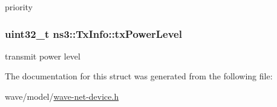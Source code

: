 priority 

\subsubsection[{\texorpdfstring{tx\+Power\+Level}{txPowerLevel}}]{\setlength{\rightskip}{0pt plus 5cm}uint32\+\_\+t ns3\+::\+Tx\+Info\+::tx\+Power\+Level}\hypertarget{structns3_1_1TxInfo_a41e42165fb6589d7348de2d7c97a2c57}{}\label{structns3_1_1TxInfo_a41e42165fb6589d7348de2d7c97a2c57}


transmit power level 



The documentation for this struct was generated from the following file\+:\begin{DoxyCompactItemize}
\item 
wave/model/\hyperlink{wave-net-device_8h}{wave-\/net-\/device.\+h}\end{DoxyCompactItemize}
